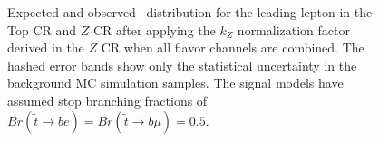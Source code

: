 \begin{figure}[p]
  \centering
  \caption[
    Expected and observed \pt\ distribution for the leading lepton in
    the Top CR and $Z$ CR after applying the $k_Z$ normalization factor derived
    in the $Z$ CR when all flavor channels are combined.
  ]{
    Expected and observed \pt\ distribution for the leading lepton in
    the Top CR and $Z$ CR after applying the $k_Z$ normalization factor derived
    in the $Z$ CR when all flavor channels are combined.
    The hashed error bands show only the statistical uncertainty in the
    background MC simulation samples.
    The signal models have assumed stop branching fractions of
    $Br(\tilde{t}\rightarrow be) = Br(\tilde{t}\rightarrow b\mu) = 0.5$.
  }
  \label{fig:cr_lep_pt_0__w_norm_factor}
\end{figure}

